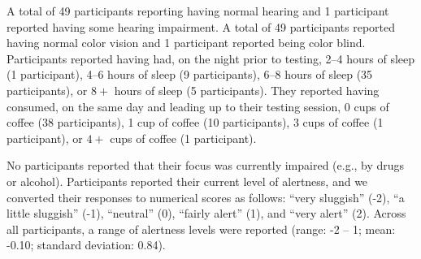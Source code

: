 \documentclass[10pt]{article}
\begin{document}
A total of 49 participants reporting having normal hearing and 1
participant reported having some hearing impairment. A total of 49
participants reported having normal color vision and 1 participant
reported being color blind.  Participants reported having had, on the
night prior to testing, 2--4 hours of sleep (1 participant), 4--6
hours of sleep (9 participants), 6--8 hours of sleep (35
participants), or $8+$ hours of sleep (5 participants). They reported
having consumed, on the same day and leading up to their testing
session, 0 cups of coffee (38 participants), 1 cup of coffee (10
participants), 3 cups of coffee (1 participant), or $4+$ cups of
coffee (1 participant).

No participants reported that their focus was currently impaired
(e.g., by drugs or alcohol).  Participants reported their current
level of alertness, and we converted their responses to numerical
scores as follows: ``very sluggish'' (-2), ``a little sluggish'' (-1),
``neutral'' (0), ``fairly alert'' (1), and ``very alert'' (2). Across
all participants, a range of alertness levels were reported (range: -2
-- 1; mean: -0.10; standard deviation: 0.84).
\end{document}
